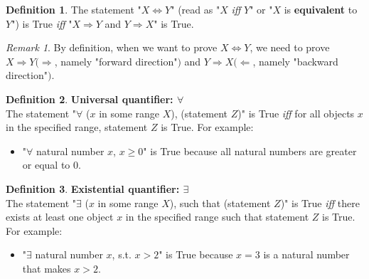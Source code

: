 \documentclass{book}
\theoremstyle{remark}
\newtheorem{remark}{Remark}[section]
\theoremstyle{definition}
\newtheorem{definition}{Definition}[section]
\begin{document}
\begin{definition}
    The statement "$X \Leftrightarrow Y$" (read as "$X$ \textit{iff} $Y$" or "$X$ is \textbf{equivalent} to $Y$") is True \textit{iff} "$X \Rightarrow Y$ and $Y \Rightarrow X$" is True.
\end{definition}

\begin{remark}
    By definition, when we want to prove $X \Leftrightarrow Y$, we need to prove $X \Rightarrow Y (\Rightarrow$, namely "forward direction"$)$ and $Y \Rightarrow X (\Leftarrow$, namely "backward direction"$)$.
\end{remark}

\begin{definition}
    \textbf{Universal quantifier: $\forall$}\\
    The statement "$\forall$ ($x$ in some range $X$), (statement $Z$)" is True \textit{iff} for all objects $x$ in the specified range, statement $Z$ is True. For example:
    \begin{itemize}
        \item "$\forall $ natural number $x$, $x\ge 0$" is True because all natural numbers are greater or equal to 0.
    \end{itemize}
\end{definition}

\begin{definition}
    \textbf{Existential quantifier: $\exists$}\\
    The statement "$\exists$ ($x$ in some range $X$), such that (statement $Z$)" is True \textit{iff} there exists at least one object $x$ in the specified range such that statement $Z$ is True. For example:
    \begin{itemize}
        \item "$\exists$ natural number $x$, s.t. $x>2$" is True because $x=3$ is a natural number that makes $x>2$.
    \end{itemize}
\end{definition}
\end{document}
